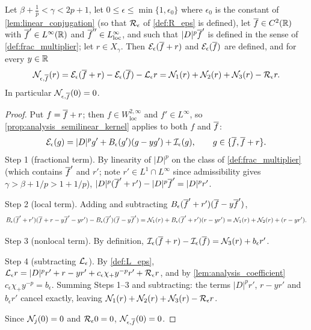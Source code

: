 \begin{lemma}
  \label{lem:c10_N_decomposition}
  Let $\beta+\frac1p<\gamma<2p+1$, let $0\le\epsilon\le\min\{1,\epsilon_0\}$ where $\epsilon_0$ is the
  constant of \cref{lem:linear_conjugation} (so that $\mathcal{R}_\epsilon$ of \cref{def:R_eps} is defined), let
  $\overline{f}\in C^2(\mathbb{R})$ with $\overline{f}'\in L^\infty(\mathbb{R})$ and $\overline{f}''\in L^\infty_{\mathrm{loc}}$, and such that
  $|D|^p\overline{f}'$ is defined in the sense of \cref{def:frac_multiplier}; let $r\in X_\gamma$. Then
  $\mathcal{E}_\epsilon(\overline{f}+r)$ and $\mathcal{E}_\epsilon(\overline{f})$ are defined, and for every $y\in\mathbb{R}$
  \[
    \mathcal{N}_{\epsilon,\overline{f}}(r)
    =\mathcal{E}_\epsilon(\overline{f}+r)-\mathcal{E}_\epsilon(\overline{f})-\mathcal{L}_\epsilon r
    =\mathcal{N}_1(r)+\mathcal{N}_2(r)+\mathcal{N}_3(r)-\mathcal{R}_\epsilon r .
  \]
  In particular $\mathcal{N}_{\epsilon,\overline{f}}(0)=0$.
\end{lemma}
\begin{proof}
  Put $f=\overline{f}+r$; then $f\in W^{2,\infty}_{\mathrm{loc}}$ and $f'\in L^\infty$, so
  \cref{prop:analysis_semilinear_kernel} applies to both $f$ and $\overline{f}$:
  \[
    \mathcal{E}_\epsilon(g)=|D|^pg'+B_\epsilon(g')(g-yg')+\mathcal{I}_\epsilon(g),\qquad g\in\{\overline{f},\overline{f}+r\}.
  \]
  Step 1 (fractional term). By linearity of $|D|^p$ on the class of \cref{def:frac_multiplier}
  (which contains $\overline{f}'$ and $r'$; note $r'\in L^1\cap L^\infty$ since admissibility gives
  $\gamma>\beta+1/p>1+1/p$),
  $|D|^p(\overline{f}'+r')-|D|^p\overline{f}'=|D|^pr'$.

  Step 2 (local term). Adding and subtracting $B_\epsilon(\overline{f}'+r')(\overline{f}-y\overline{f}')$,
  \[
    B_\epsilon(\overline{f}'+r')(\overline{f}+r-y\overline{f}'-yr')-B_\epsilon(\overline{f}')(\overline{f}-y\overline{f}')
    =\mathcal{N}_1(r)+B_\epsilon(\overline{f}'+r')(r-yr')
    =\mathcal{N}_1(r)+\mathcal{N}_2(r)+(r-yr').
  \]

  Step 3 (nonlocal term). By definition, $\mathcal{I}_\epsilon(\overline{f}+r)-\mathcal{I}_\epsilon(\overline{f})=\mathcal{N}_3(r)+b_\epsilon r'$.

  Step 4 (subtracting $\mathcal{L}_\epsilon$). By \cref{def:L_eps},
  $\mathcal{L}_\epsilon r=|D|^pr'+r-yr'+c_\epsilon\chi_+y^{-p}r'+\mathcal{R}_\epsilon r$, and by
  \cref{lem:analysis_coefficient} $c_\epsilon\chi_+y^{-p}=b_\epsilon$. Summing Steps 1--3 and subtracting:
  the terms $|D|^pr'$, $r-yr'$ and $b_\epsilon r'$ cancel exactly, leaving
  $\mathcal{N}_1(r)+\mathcal{N}_2(r)+\mathcal{N}_3(r)-\mathcal{R}_\epsilon r$.

  Since $\mathcal{N}_j(0)=0$ and $\mathcal{R}_\epsilon0=0$, $\mathcal{N}_{\epsilon,\overline{f}}(0)=0$.
\end{proof}

